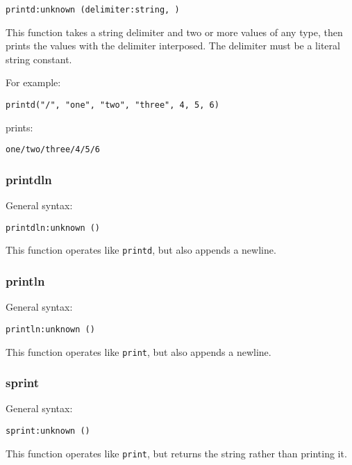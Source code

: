\documentclass[twoside,english]{article}
\newenvironment{vindent}
{\begin{list}{}{\setlength{\listparindent}{6pt}}
\item[]}
{\end{list}}
\begin{document}
\begin{vindent}
\begin{verbatim}
printd:unknown (delimiter:string, )
\end{verbatim}
\end{vindent}
This function takes a string delimiter and two or more values of any type, then
prints the values with the delimiter interposed. The delimiter must be a
literal string constant.

For example:
\begin{vindent}
\begin{verbatim}
printd("/", "one", "two", "three", 4, 5, 6)
\end{verbatim}
\end{vindent}
prints:
\begin{vindent}
\begin{verbatim}
one/two/three/4/5/6
\end{verbatim}
\end{vindent}

\subsubsection{printdln}
General syntax:

\begin{vindent}
\begin{verbatim}
printdln:unknown ()
\end{verbatim}
\end{vindent}
This function operates like \texttt{printd}, but also appends a newline.

\subsubsection{println}
General syntax:

\begin{vindent}
\begin{verbatim}
println:unknown ()
\end{verbatim}
\end{vindent}
This function operates like \texttt{print}, but also appends a newline.

\subsubsection{sprint}
General syntax:

\begin{vindent}
\begin{verbatim}
sprint:unknown ()
\end{verbatim}
\end{vindent}
This function operates like \texttt{print}, but returns the string rather
than printing it.
\end{document}

